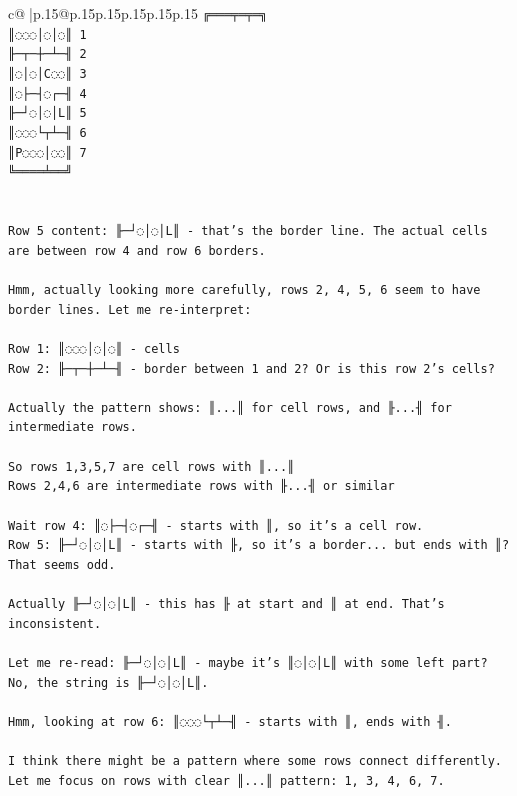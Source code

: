 \documentclass{article}
\begin{document}
{\begin{supertabular}{c@{$\;$}|p{.15\linewidth}@{}p{.15\linewidth}p{.15\linewidth}p{.15\linewidth}p{.15\linewidth}p{.15\linewidth}}
{{{\texttt{╔═══╤═╤═╗} \\
\texttt{║◌◌◌│◌│◌║ 1} \\
\texttt{╟─┬─┼─┴─╢ 2} \\
\texttt{║◌│◌│C◌◌║ 3} \\
\texttt{║◌├─┤◌┌─╢ 4} \\
\texttt{╟─┘◌│◌│L║ 5} \\
\texttt{║◌◌◌└┬┴─╢ 6} \\
\texttt{║P◌◌◌│◌◌║ 7} \\
\texttt{╚════╧══╝} \\
\\ 
\\ 
\texttt{Row 5 content: ╟─┘◌│◌│L║ {-} that's the border line. The actual cells are between row 4 and row 6 borders.} \\
\\ 
\texttt{Hmm, actually looking more carefully, rows 2, 4, 5, 6 seem to have border lines. Let me re{-}interpret:} \\
\\ 
\texttt{Row 1: ║◌◌◌│◌│◌║ {-} cells} \\
\texttt{Row 2: ╟─┬─┼─┴─╢ {-} border between 1 and 2? Or is this row 2's cells?} \\
\\ 
\texttt{Actually the pattern shows: ║...║ for cell rows, and ╟...╢ for intermediate rows.} \\
\\ 
\texttt{So rows 1,3,5,7 are cell rows with ║...║} \\
\texttt{Rows 2,4,6 are intermediate rows with ╟...╢ or similar} \\
\\ 
\texttt{Wait row 4: ║◌├─┤◌┌─╢ {-} starts with ║, so it's a cell row.} \\
\texttt{Row 5: ╟─┘◌│◌│L║ {-} starts with ╟, so it's a border... but ends with ║? That seems odd.} \\
\\ 
\texttt{Actually ╟─┘◌│◌│L║ {-} this has ╟ at start and ║ at end. That's inconsistent.} \\
\\ 
\texttt{Let me re{-}read: ╟─┘◌│◌│L║ {-} maybe it's ║◌│◌│L║ with some left part? No, the string is ╟─┘◌│◌│L║.} \\
\\ 
\texttt{Hmm, looking at row 6: ║◌◌◌└┬┴─╢ {-} starts with ║, ends with ╢.} \\
\\ 
\texttt{I think there might be a pattern where some rows connect differently. Let me focus on rows with clear ║...║ pattern: 1, 3, 4, 6, 7.} \\
}}}
\end{supertabular}}
\end{document}
